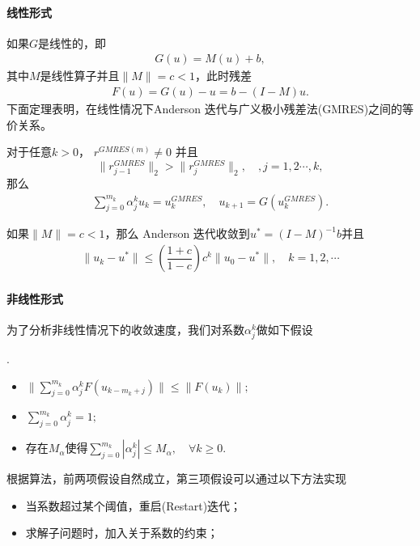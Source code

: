 	
	\paragraph{线性形式} 如果$ G $是线性的，即
	\begin{align*}
	G(u) = M(u) + b ,
	\end{align*}
	其中$ M $是线性算子并且$ \|M\|=c<1 $，此时残差
	\begin{align*}
	F(u) = G(u) -u = b - (I-M)u.
	\end{align*}
	下面定理表明，在线性情况下Anderson 迭代与广义极小残差法(GMRES)之间的等价关系。
	\begin{theorem}
		对于任意$ k>0 $， $ r^{GMRES(m)} \neq 0$ 并且$$ \|r_{j-1}^{GMRES}\|_2> \|r_{j}^{GMRES}\|_2, \quad,j=1,2\cdots,k,$$ 那么
		\begin{align*}
		\sum_{j=0}^{m_k}\alpha^k_ju_k = u_k^{GMRES},\quad u_{k+1} = G(u_k^{GMRES}).
		\end{align*}
	\end{theorem}

	\begin{theorem}
		如果$ \|M\| = c<1 $，那么 Anderson 迭代收敛到$ u^* = (I-M)^{-1}b $并且
		\begin{align*}
		\|u_k - u^*\| \leq \left(\dfrac{1+c}{1-c}\right)c^k \|u_0 - u^*\|,\quad k = 1,2,\cdots
		\end{align*}
	\end{theorem}

	\paragraph{非线性形式} 
	为了分析非线性情况下的收敛速度，我们对系数$ \alpha_j^k $做如下假设
	\begin{assumption}.
		\label{assm:alpha}
		\begin{itemize}
			\item $ \|\sum_{j=0}^{m_k}\alpha_j^kF(u_{k-m_k+j})\| \leq \|F(u_k)\|; $
			\item $ \sum_{j=0}^{m_k}\alpha_j^k = 1; $
			\item 	存在$M_\alpha  $使得$
			\sum_{j=0}^{m_k}|\alpha_j^k| \leq M_\alpha,\quad \forall k\geq 0.$
		\end{itemize}		
	\end{assumption}
	根据算法，前两项假设自然成立，第三项假设可以通过以下方法实现
	\begin{itemize}
		\item 当系数超过某个阈值，重启(Restart)迭代；
		\item 求解子问题时，加入关于系数的约束；
	\end{itemize}

